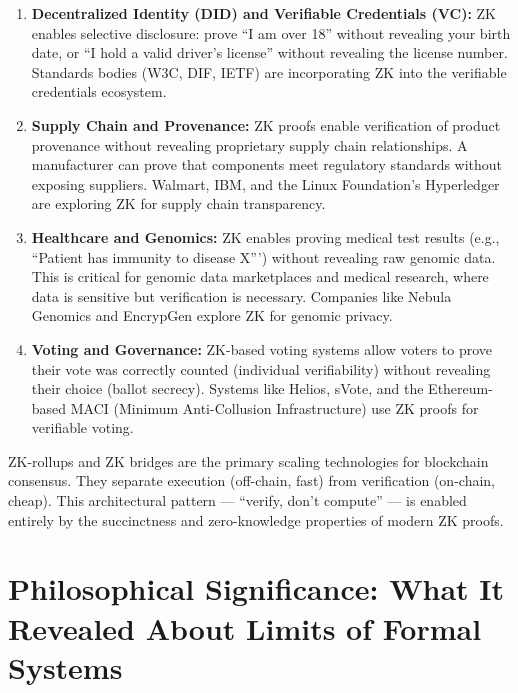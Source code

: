 \begin{enumerate}
\item \textbf{Decentralized Identity (DID) and Verifiable Credentials (VC):} ZK enables selective disclosure: prove ``I am over 18'' without revealing your birth date, or ``I hold a valid driver's license'' without revealing the license number. Standards bodies (W3C, DIF, IETF) are incorporating ZK into the verifiable credentials ecosystem.

\item \textbf{Supply Chain and Provenance:} ZK proofs enable verification of product provenance without revealing proprietary supply chain relationships. A manufacturer can prove that components meet regulatory standards without exposing suppliers. Walmart, IBM, and the Linux Foundation's Hyperledger are exploring ZK for supply chain transparency.

\item \textbf{Healthcare and Genomics:} ZK enables proving medical test results (e.g., ``Patient has immunity to disease X''') without revealing raw genomic data. This is critical for genomic data marketplaces and medical research, where data is sensitive but verification is necessary. Companies like Nebula Genomics and EncrypGen explore ZK for genomic privacy.

\item \textbf{Voting and Governance:} ZK-based voting systems allow voters to prove their vote was correctly counted (individual verifiability) without revealing their choice (ballot secrecy). Systems like Helios, sVote, and the Ethereum-based MACI (Minimum Anti-Collusion Infrastructure) use ZK proofs for verifiable voting.
\end{enumerate}

ZK-rollups and ZK bridges are the primary scaling technologies for blockchain consensus. They separate execution (off-chain, fast) from verification (on-chain, cheap). This architectural pattern --- ``verify, don't compute'' --- is enabled entirely by the succinctness and zero-knowledge properties of modern ZK proofs.

\section{Philosophical Significance: What It Revealed About Limits of Formal Systems}
\label{sec:zk:philosophy}

